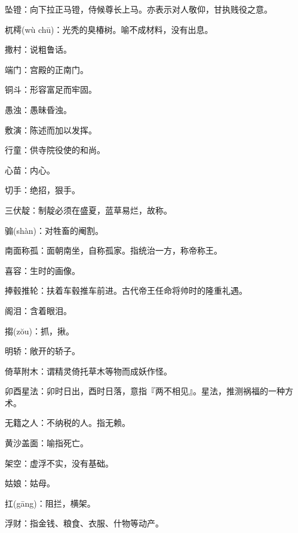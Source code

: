 \startbuffer[1361]
坠镫：向下拉正马镫，侍候尊长上马。亦表示对人敬仰，甘执贱役之意。
\stopbuffer


\startbuffer[1362]
杌樗(wù chū)：光秃的臭椿树。喻不成材料，没有出息。
\stopbuffer


\startbuffer[1363]
撒村：说粗鲁话。
\stopbuffer


\startbuffer[1364]
端门：宫殿的正南门。
\stopbuffer


\startbuffer[1365]
铜斗：形容富足而牢固。
\stopbuffer


\startbuffer[1366]
愚浊：愚昧昏浊。
\stopbuffer


\startbuffer[1367]
敷演：陈述而加以发挥。
\stopbuffer


\startbuffer[1368]
行童：供寺院役使的和尚。
\stopbuffer


\startbuffer[1369]
心苗：内心。
\stopbuffer


\startbuffer[1370]
切手：绝招，狠手。
\stopbuffer


\startbuffer[1371]
三伏靛：制靛必须在盛夏，蓝草易烂，故称。
\stopbuffer


\startbuffer[1372]
骟(shàn)：对牲畜的阉割。
\stopbuffer


\startbuffer[1373]
南面称孤：面朝南坐，自称孤家。指统治一方，称帝称王。
\stopbuffer


\startbuffer[1374]
喜容：生时的画像。
\stopbuffer


\startbuffer[1375]
捧毂推轮：扶着车毂推车前进。古代帝王任命将帅时的隆重礼遇。
\stopbuffer


\startbuffer[1376]
阁泪：含着眼泪。
\stopbuffer


\startbuffer[1377]
搊(zŏu)：抓，揪。
\stopbuffer


\startbuffer[1378]
明轿：敞开的轿子。
\stopbuffer


\startbuffer[1379]
倚草附木：谓精灵倚托草木等物而成妖作怪。
\stopbuffer


\startbuffer[1380]
卯酉星法：卯时日出，酉时日落，意指『两不相见』。星法，推测祸福的一种方术。
\stopbuffer


\startbuffer[1381]
无籍之人：不纳税的人。指无赖。
\stopbuffer


\startbuffer[1382]
黄沙盖面：喻指死亡。
\stopbuffer


\startbuffer[1383]
架空：虚浮不实，没有基础。
\stopbuffer


\startbuffer[1384]
姑娘：姑母。
\stopbuffer


\startbuffer[1385]
扛(gāng)：阻拦，横架。
\stopbuffer


\startbuffer[1386]
浮财：指金钱、粮食、衣服、什物等动产。
\stopbuffer


